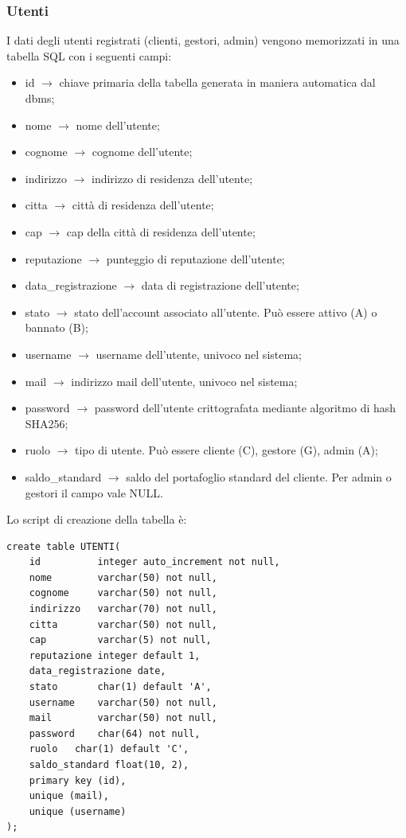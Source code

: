 \documentclass[a4paper, 14pt]{article}
\begin{document}
\begin{flushleft}
			\subsubsection{Utenti}
				I dati degli utenti registrati (clienti, gestori, admin) vengono memorizzati in una tabella SQL con i seguenti campi:
				\begin{itemize}
					\item id $\rightarrow$ chiave primaria della tabella generata in maniera automatica dal dbms;
					\item nome $\rightarrow$ nome dell'utente;
					\item cognome $\rightarrow$ cognome dell'utente;
					\item indirizzo $\rightarrow$ indirizzo di residenza dell'utente;
					\item citta $\rightarrow$ città di residenza dell'utente;
					\item cap $\rightarrow$ cap della città di residenza dell'utente;
					\item reputazione $\rightarrow$ punteggio di reputazione dell'utente;
					\item data\_registrazione $\rightarrow$ data di registrazione dell'utente;
					\item stato $\rightarrow$ stato dell'account associato all'utente. Può essere attivo (A) o bannato (B);
					\item username $\rightarrow$ username dell'utente, univoco nel sistema;
					\item mail $\rightarrow$ indirizzo mail dell'utente, univoco nel sistema;
					\item password $\rightarrow$ password dell'utente crittografata mediante algoritmo di hash SHA256;
					\item ruolo $\rightarrow$ tipo di utente. Può essere cliente (C), gestore (G), admin (A);
					\item saldo\_standard $\rightarrow$ saldo del portafoglio standard del cliente. Per admin o gestori il campo vale NULL.
				\end{itemize}
				Lo script di creazione della tabella è: \\
				\begin{lstlisting}
create table UTENTI(
	id          integer auto_increment not null,
	nome        varchar(50) not null,
	cognome     varchar(50) not null,
	indirizzo   varchar(70) not null,
	citta       varchar(50) not null,
	cap         varchar(5) not null,
	reputazione integer default 1,
	data_registrazione date,
	stato       char(1) default 'A',
	username    varchar(50) not null,
	mail        varchar(50) not null,
	password    char(64) not null,
	ruolo   char(1) default 'C',
	saldo_standard float(10, 2),
	primary key (id),
	unique (mail),
	unique (username)
);
				\end{lstlisting}


\end{flushleft}
\end{document}

